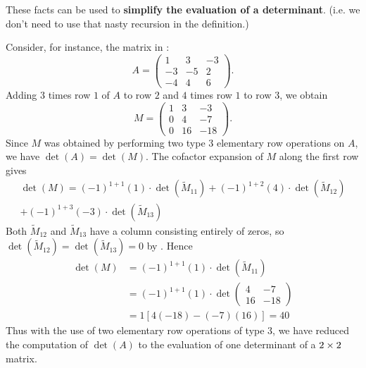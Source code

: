 These facts can be used to \textbf{simplify the evaluation of a determinant}. (i.e. we don't need to use that nasty recursion in the definition.)

Consider, for instance, the matrix in :
\[
    A = \begin{pmatrix} 1 & 3 & -3 \\ -3 & -5 & 2 \\ -4 & 4 & 6 \end{pmatrix}.
\]
Adding \(3\) times row \(1\) of \(A\) to row \(2\) and \(4\) times row \(1\) to row \(3\), we obtain
\[
    M = \begin{pmatrix} 1 & 3 & -3 \\ 0 & 4 & -7 \\ 0 & 16 & -18 \end{pmatrix}.
\]
Since \(M\) was obtained by performing two type 3 elementary row operations on \(A\), we have \(\det(A) = \det(M)\).
The cofactor expansion of \(M\) along the first
row gives
\[
    \begin{array}{c} \det(M) = (-1)^{1+1}(1) \cdot \det\left(\tilde{M}_{11}\right)+(-1)^{1+2}(4) \cdot \det\left(\tilde{M}_{12}\right) \\
    +(-1)^{1+3}(-3) \cdot \det\left(\tilde{M}_{13}\right)
\end{array}
\]
Both \(\tilde{M}_{12}\) and \(\tilde{M}_{13}\) have a column consisting entirely of zeros, so \(\det( \tilde{M}_{12}) = \det(\tilde{M}_{13}) = 0\) by .
Hence
\[
    \begin{aligned}
        \det(M) &=(-1)^{1+1}(1) \cdot \det\left(\tilde{M}_{11}\right) \\
        &=(-1)^{1+1}(1) \cdot \det\left(\begin{array}{rr}
        4 & -7 \\
        16 & -18
        \end{array}\right) \\
        &=1[4(-18)-(-7)(16)]=40
    \end{aligned}
\]
Thus with the use of two elementary row operations of type 3, we have reduced the computation of \(\det(A)\) to the evaluation of one determinant of a \(2 \times 2\) matrix.

